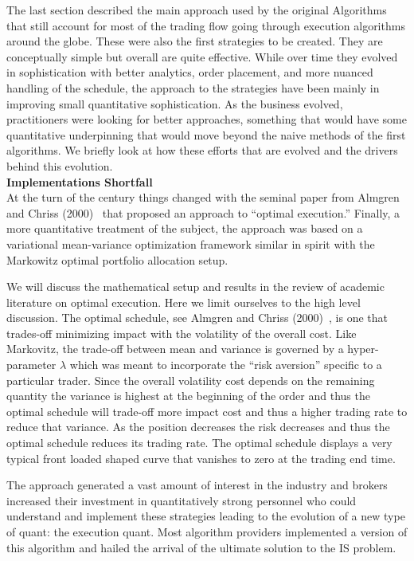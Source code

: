 The last section described the main approach used by the original Algorithms that still account for most of the trading flow going through execution algorithms around the globe. These were also the  first strategies to be created. They are conceptually simple but overall are quite effective. While over time they evolved in sophistication with better analytics, order placement, and more nuanced handling of the schedule, the approach to the strategies have been mainly in improving small quantitative sophistication. As the business evolved, practitioners were looking for better approaches, something that would have some quantitative underpinning that would move beyond the naive methods of the first algorithms. We briefly look at how these efforts that are evolved and the drivers behind this evolution. \\


\noindent\textbf{Implementations Shortfall} \\


At the turn of the century things changed with the seminal paper from Almgren and Chriss (2000)~\cite{alm2000} that proposed an approach to ``optimal execution.'' Finally, a more quantitative treatment of the subject, the approach was based on a variational  mean-variance optimization framework similar in spirit with the Markowitz optimal portfolio allocation setup.



We will discuss the  mathematical setup and results in the review of  academic literature on optimal execution. Here we limit ourselves to the high level discussion. The optimal schedule, see Almgren and Chriss (2000)~\cite{alm2000}, is one that trades-off minimizing impact with the volatility of the overall cost. Like Markovitz, the trade-off between mean and variance is governed by a hyper-parameter $\lambda$ which was meant to incorporate the ``risk aversion'' specific to a particular trader. Since the overall volatility cost depends on the remaining quantity the variance is highest at the beginning of the order and thus the optimal schedule will trade-off more impact cost and thus a higher trading rate to reduce that variance. As the position decreases the risk decreases and thus the optimal schedule reduces its trading rate. The optimal schedule displays a very typical front loaded shaped curve that vanishes to zero at the trading end time.


The approach generated a vast amount of interest in the industry and brokers increased their investment in quantitatively strong personnel who could understand and implement these strategies leading to the evolution of a new type of quant: the execution quant. Most algorithm providers implemented a version of this algorithm and hailed the arrival of the ultimate solution to the IS problem. 


